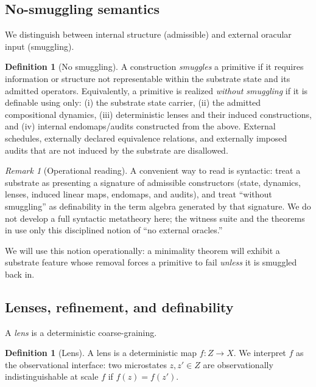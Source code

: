 \documentclass[11pt]{article}
\theoremstyle{definition}
\newtheorem{definition}[theorem]{Definition}
\theoremstyle{remark}
\newtheorem{remark}[theorem]{Remark}
\begin{document}
\subsection{No-smuggling semantics}
\label{sec:def-nosmuggling}

We distinguish between internal structure (admissible) and external oracular input (smuggling).

\begin{definition}[No smuggling]
\label{def:no-smuggling}
A construction \emph{smuggles} a primitive if it requires information or structure not representable within the substrate state and its admitted operators.
Equivalently, a primitive is realized \emph{without smuggling} if it is definable using only:
(i) the substrate state carrier,
(ii) the admitted compositional dynamics,
(iii) deterministic lenses and their induced constructions,
and (iv) internal endomaps/audits constructed from the above.
External schedules, externally declared equivalence relations, and externally imposed audits that are not induced by the substrate are disallowed.
\end{definition}

\begin{remark}[Operational reading]
A convenient way to read  is syntactic: treat a substrate as presenting a signature of admissible constructors (state, dynamics, lenses, induced linear maps, endomaps, and audits), and treat ``without smuggling'' as definability in the term algebra generated by that signature.
We do not develop a full syntactic metatheory here; the witness suite and the theorems in  use only this disciplined notion of ``no external oracles.''
\end{remark}

We will use this notion operationally: a minimality theorem will exhibit a substrate feature whose removal forces a primitive to fail \emph{unless} it is smuggled back in.

\subsection{Lenses, refinement, and definability}

A \emph{lens} is a deterministic coarse-graining.

\begin{definition}[Lens]
\label{def:lens}
A lens is a deterministic map $f:Z\to X$.
We interpret $f$ as the observational interface: two microstates $z,z'\in Z$ are observationally indistinguishable at scale $f$ if $f(z)=f(z')$.
\end{definition}
\end{document}
